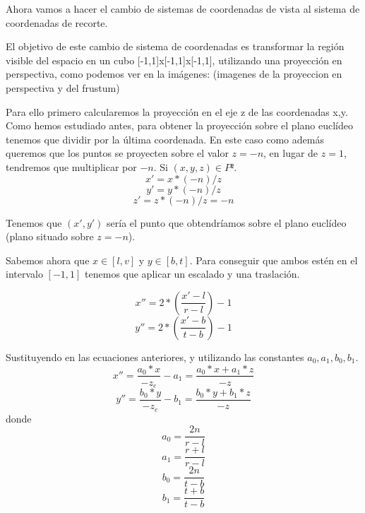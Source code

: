 \documentclass[a4paper,11pt, oneside]{book}
\begin{document}
Ahora vamos a hacer el cambio de sistemas de coordenadas de vista al sistema de coordenadas de recorte.

El objetivo de este cambio de sistema de coordenadas es transformar la región visible del espacio en un cubo [-1,1]x[-1,1]x[-1,1], utilizando una proyección en perspectiva, como podemos ver en la imágenes: (imagenes de la proyeccion en perspectiva y del frustum)


Para ello primero calcularemos la proyección en el eje z de las coordenadas x,y. Como hemos estudiado antes, para obtener la proyección sobre el plano euclídeo tenemos que dividir por la última coordenada. En este caso como además queremos que los puntos se proyecten sobre el valor $z=-n$, en lugar de $z=1$, tendremos que multiplicar por $-n$. Si $(x,y,z) \in P²$.
\begin{equation}
x' = x*(-n)/z
\end{equation}
\begin{equation}
y' = y*(-n)/z
\end{equation}
\begin{equation}
z' = z*(-n)/z = -n
\end{equation}

Tenemos que $(x',y')$ sería el punto que obtendríamos sobre el plano euclídeo (plano situado sobre $z=-n$).

Sabemos ahora que $x \in [l,v]$ y $y \in [b,t]$. Para conseguir que ambos estén en el intervalo $[-1,1]$ tenemos que aplicar un escalado y una traslación. 

\begin{equation}
x'' = 2*(\frac{x'-l}{r-l})-1
\end{equation}
\begin{equation}
y'' = 2*(\frac{x'-b}{t-b})-1
\end{equation}

Sustituyendo en las ecuaciones anteriores, y utilizando las constantes $a_0,a_1, b_0, b_1$.
\begin{equation}
x'' = \frac{a_0*x}{-z_e} -a_1 = \frac{a_0*x+a_1*z}{-z}
\end{equation}
\begin{equation}
y'' = \frac{b_0*y}{-z_e} -b_1 = \frac{b_0*y+b_1*z}{-z}
\end{equation}
donde
\begin{equation}
a_0 = \frac{2n}{r-l}
\end{equation}
\begin{equation}
a_1 = \frac{r+l}{r-l}
\end{equation}
\begin{equation}
b_0 = \frac{2n}{t-b}
\end{equation}
\begin{equation}
b_1 = \frac{t+b}{t-b}
\end{equation}
\end{document}
